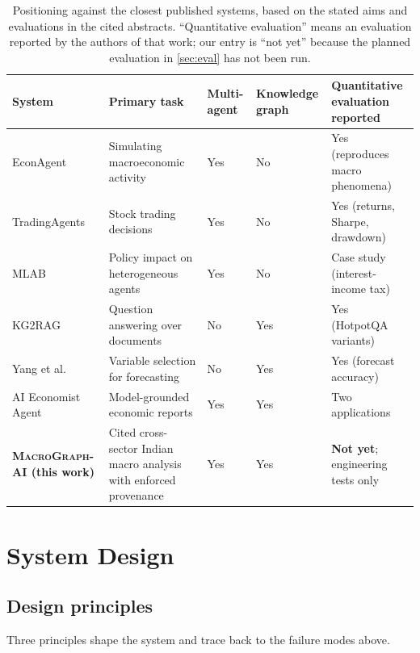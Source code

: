 \documentclass[conference]{IEEEtran}
\newcommand{\sys}{\textsc{MacroGraph-AI}}
\begin{document}
\begin{table}[t]
\centering
\caption{Positioning against the closest published systems, based on the stated aims and evaluations in the cited abstracts. ``Quantitative evaluation'' means an evaluation reported by the authors of that work; our entry is ``not yet'' because the planned evaluation in \cref{sec:eval} has not been run.}
\label{tab:related}
\small
\begin{tabular}{@{}p{3.7cm}p{3.9cm}p{1.8cm}p{1.9cm}p{4.0cm}@{}}
\toprule
\textbf{System} & \textbf{Primary task} & \textbf{Multi-agent} & \textbf{Knowledge graph} & \textbf{Quantitative evaluation reported} \\
\midrule
EconAgent \cite{li2024econagent} & Simulating macroeconomic activity & Yes & No & Yes (reproduces macro phenomena) \\
TradingAgents \cite{xiao2024tradingagents} & Stock trading decisions & Yes & No & Yes (returns, Sharpe, drawdown) \\
MLAB \cite{hao2025mlab} & Policy impact on heterogeneous agents & Yes & No & Case study (interest-income tax) \\
KG2RAG \cite{zhu2025kg2rag} & Question answering over documents & No & Yes & Yes (HotpotQA variants) \\
Yang et al.\ \cite{yang2020kgmacro} & Variable selection for forecasting & No & Yes & Yes (forecast accuracy) \\
AI Economist Agent \cite{kato2026aieconomist} & Model-grounded economic reports & Yes & Yes & Two applications \\
\midrule
\textbf{\sys{} (this work)} & Cited cross-sector Indian macro analysis with enforced provenance & Yes & Yes & \textbf{Not yet}; engineering tests only \\
\bottomrule
\end{tabular}
\end{table}

\section{System Design}
\label{sec:design}

\subsection{Design principles}
Three principles shape the system and trace back to the failure modes above.
\end{document}
